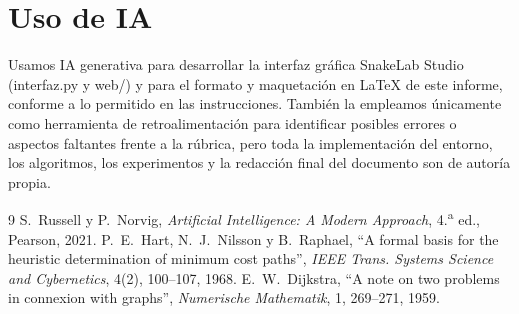 \documentclass[11pt,letterpaper]{article}
\begin{document}
\section{Uso de IA}
Usamos IA generativa para desarrollar la interfaz gráfica SnakeLab Studio (interfaz.py y web/) y para el formato y maquetación en LaTeX de este informe, conforme a lo permitido en las instrucciones. También la empleamos únicamente como herramienta de retroalimentación para identificar posibles errores o aspectos faltantes frente a la rúbrica, pero toda la implementación del entorno, los algoritmos, los experimentos y la redacción final del documento son de autoría propia.
\vspace{-4pt}\begin{thebibliography}{9}\footnotesize\setlength{\itemsep}{0pt}
 S.~Russell y P.~Norvig, \emph{Artificial Intelligence: A Modern Approach}, 4.\textsuperscript{a} ed., Pearson, 2021.
 P.~E.~Hart, N.~J.~Nilsson y B.~Raphael, ``A formal basis for the heuristic determination of minimum cost paths'', \emph{IEEE Trans. Systems Science and Cybernetics}, 4(2), 100--107, 1968.
 E.~W.~Dijkstra, ``A note on two problems in connexion with graphs'', \emph{Numerische Mathematik}, 1, 269--271, 1959.
\end{thebibliography}
\end{document}
